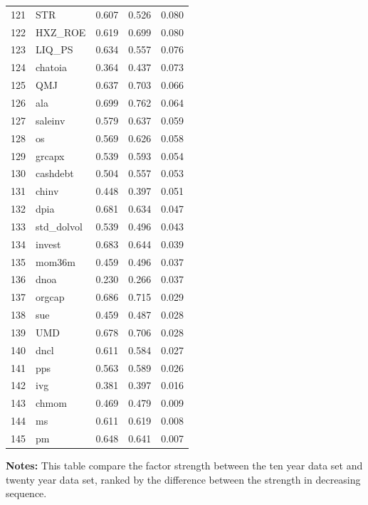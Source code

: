 \documentclass[12pt]{article}
\begin{document}
\begin{footnotesize}
\begin{longtable}{rl|c|c|c}
		121 & STR & 0.607 & 0.526 & 0.080 \\ 
		122 & HXZ\_ROE & 0.619 & 0.699 & 0.080 \\ 
		123 & LIQ\_PS & 0.634 & 0.557 & 0.076 \\ 
		124 & chatoia & 0.364 & 0.437 & 0.073 \\ 
		125 & QMJ & 0.637 & 0.703 & 0.066 \\ 
		126 & ala & 0.699 & 0.762 & 0.064 \\ 
		127 & saleinv & 0.579 & 0.637 & 0.059 \\ 
		128 & os & 0.569 & 0.626 & 0.058 \\ 
		129 & grcapx & 0.539 & 0.593 & 0.054 \\ 
		130 & cashdebt & 0.504 & 0.557 & 0.053 \\ 
		131 & chinv & 0.448 & 0.397 & 0.051 \\ 
		132 & dpia & 0.681 & 0.634 & 0.047 \\ 
		133 & std\_dolvol & 0.539 & 0.496 & 0.043 \\ 
		134 & invest & 0.683 & 0.644 & 0.039 \\ 
		135 & mom36m & 0.459 & 0.496 & 0.037 \\ 
		136 & dnoa & 0.230 & 0.266 & 0.037 \\ 
		137 & orgcap & 0.686 & 0.715 & 0.029 \\ 
		138 & sue & 0.459 & 0.487 & 0.028 \\ 
		139 & UMD & 0.678 & 0.706 & 0.028 \\ 
		140 & dncl & 0.611 & 0.584 & 0.027 \\ 
		141 & pps & 0.563 & 0.589 & 0.026 \\ 
		142 & ivg & 0.381 & 0.397 & 0.016 \\ 
		143 & chmom & 0.469 & 0.479 & 0.009 \\ 
		144 & ms & 0.611 & 0.619 & 0.008 \\ 
		145 & pm & 0.648 & 0.641 & 0.007 \\ 
		\hline
	\end{longtable}

			\begin{minipage}{0.7\textwidth}
	{\footnotesize {\bf Notes:} 	This table compare the factor strength between the ten year data set and twenty year data set, ranked by the difference between the strength in decreasing sequence.}
\end{minipage}

\end{footnotesize}
\end{document}
